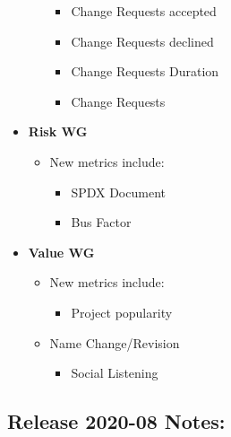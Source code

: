 \begin{itemize}
\begin{itemize}
    \begin{itemize}
    \tightlist
    \item
      Change Requests accepted
    \item
      Change Requests declined
    \item
      Change Requests Duration
    \item
      Change Requests
    \end{itemize}
  \end{itemize}
\item
  \textbf{Risk WG}

  \begin{itemize}
  \tightlist
  \item
    New metrics include:

    \begin{itemize}
    \tightlist
    \item
      SPDX Document
    \item
      Bus Factor
    \end{itemize}
  \end{itemize}
\item
  \textbf{Value WG}

  \begin{itemize}
  \tightlist
  \item
    New metrics include:

    \begin{itemize}
    \tightlist
    \item
      Project popularity
    \end{itemize}
  \item
    Name Change/Revision

    \begin{itemize}
    \tightlist
    \item
      Social Listening
    \end{itemize}
  \end{itemize}
\end{itemize}

\hypertarget{release-2020-08-notes}{%
\subsection{Release 2020-08 Notes:}\label{release-2020-08-notes}}

